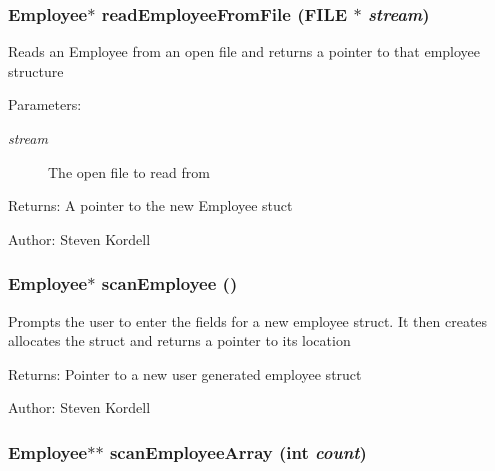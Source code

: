 \subsubsection{\setlength{\rightskip}{0pt plus 5cm}\bf{Employee}$\ast$ read\-Employee\-From\-File (FILE $\ast$ {\em stream})}\label{employeef_8c_6d5120fe031fb831e66d4608e939d708}


Reads an Employee from an open file and returns a pointer to that employee structure \begin{Desc}
\item[Parameters:]
\begin{description}
\item[{\em stream}]The open file to read from \end{description}
\end{Desc}
\begin{Desc}
\item[Returns:]A pointer to the new Employee stuct \end{Desc}
\begin{Desc}
\item[Author:]Steven Kordell \end{Desc}
\subsubsection{\setlength{\rightskip}{0pt plus 5cm}\bf{Employee}$\ast$ scan\-Employee ()}\label{employeef_8c_9dfe01c30ede04a179b17ad2badca262}


Prompts the user to enter the fields for a new employee struct. It then creates allocates the struct and returns a pointer to its location \begin{Desc}
\item[Returns:]Pointer to a new user generated employee struct \end{Desc}
\begin{Desc}
\item[Author:]Steven Kordell \end{Desc}
\subsubsection{\setlength{\rightskip}{0pt plus 5cm}\bf{Employee}$\ast$$\ast$ scan\-Employee\-Array (int {\em count})}\label{employeef_8c_97f7039a15deadb100a9cfaf38ef9a39}


